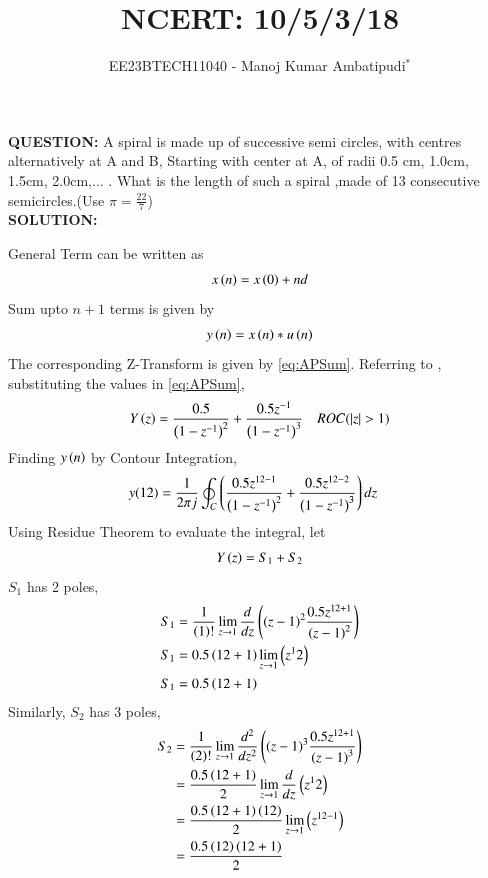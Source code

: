 \documentclass[journal,12pt,twocolumn]{IEEEtran}
\theoremstyle{remark}
\begin{document}

\vspace{3cm}
\title{NCERT: 10/5/3/18}
\author{EE23BTECH11040 - Manoj Kumar Ambatipudi$^{*}$%
}
\maketitle
\newpage
\bigskip
\renewcommand{\thefigure}{\theenumi}
\renewcommand{\thetable}{\theenumi}
\textbf{QUESTION:}
A spiral is made up of successive semi circles, with centres alternatively at A and B, Starting with center at A, of radii 0.5 cm, 1.0cm, 1.5cm, 2.0cm,... . What is the length of such a spiral ,made of 13 consecutive semicircles.(Use $\pi = \frac{22}{7}$) \\
\textbf{SOLUTION:}


General Term can be written as 
\begin{align}
    x\left(n\right) = x\left(0\right) + nd
\end{align}
Sum upto $n + 1$ terms is given by
\begin{align}
    y\left(n\right) = x\left(n\right)*u\left(n\right)
\end{align}
The corresponding Z-Transform is given by \eqref{eq:APSum}.
Referring to , substituting the values in \eqref{eq:APSum}, 
\begin{align}
    Y\left(z\right) = \frac{0.5}{\left(1 - z^{-1}\right)^2} + \frac{0.5z^{-1}}{\left(1-z^{-1}\right)^3} \quad ROC(\left\vert z\right\vert > 1)
\end{align}
Finding $y\left(n\right)$ by Contour Integration, 
\begin{align}
     y(12)&=\frac{1}{2\pi j}\oint_{C}\left(\dfrac{0.5z^{12-1}}{\left(1-z^{-1}\right)^2} + \dfrac{0.5z^{12-2}}{\left(1-z^{-1}\right)^{3}}\right)dz  
\end{align}
Using Residue Theorem to evaluate the integral, let 
\begin{align}
    Y\left(z\right) = S_{1} + S_{2}
\end{align}
$S_{1}$ has 2 poles,
\begin{align}
    S_{1} &= \frac{1}{\left(1\right)!}\lim\limits_{z\to 1}\frac{d}{dz}\left({(z-1)}^{2}\frac{0.5z^{12+1}}{{(z-1)}^2}\right)\\
    S_{1} &= 0.5\left(12+1\right)\lim\limits_{z\to 1}\left(z^12\right)\\
    S_{1} &=0.5\left(12+1\right)
\end{align}
Similarly, $S_{2}$ has 3 poles, 
\begin{align}
    S_{2}&=\frac{1}{\left(2\right)!}\lim\limits_{z\to 1}\frac{d^{2}}{dz^{2}}\left({(z-1)}^{3}\frac{0.5z^{12+1}}{{(z-1)}^3}\right)\\
    &=\frac{0.5\left(12+1\right)}{2}\lim\limits_{z\to 1}\frac{d}{dz}\left(z^12\right)\\
    &=\frac{0.5\left(12+1\right)\left(12\right)}{2}\lim\limits_{z\to 1}\left(z^{12-1}\right)\\
    &=\frac{0.5\left(12\right)\left(12+1\right)}{2}
\end{align}
\end{document}
